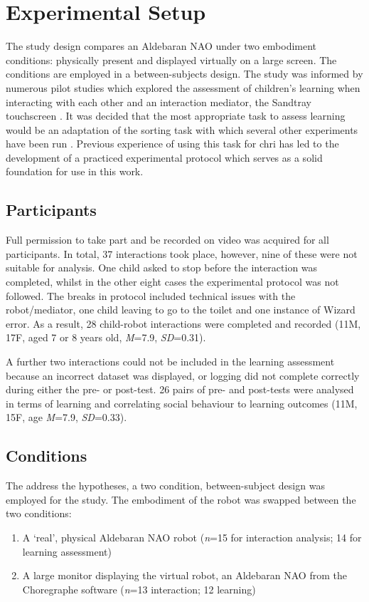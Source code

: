 \section{Experimental Setup}\label{sec:ch6-embodiment-setup}
The study design compares an Aldebaran NAO under two embodiment conditions: physically present and displayed virtually on a large screen. The conditions are employed in a between-subjects design. The study was informed by numerous pilot studies which explored the assessment of children's \gls{learning} when interacting with each other and an interaction mediator, the Sandtray touchscreen \citep{baxter2012touchscreen}. It was decided that the most appropriate task to assess \gls{learning} would be an adaptation of the sorting task with which several other experiments have been run \citep{baxter2013emergence, kennedy2013constraining}. Previous experience of using this task for \acrshort{chri} has led to the development of a practiced experimental protocol which serves as a solid foundation for use in this work.

\subsection{Participants}
Full permission to take part and be recorded on video was acquired for all participants. In total, 37 interactions took place, however, nine of these were not suitable for analysis. One child asked to stop before the interaction was completed, whilst in the other eight cases the experimental protocol was not followed. The breaks in protocol included technical issues with the robot/mediator, one child leaving to go to the toilet and one instance of Wizard error. As a result, 28 child-robot interactions were completed and recorded (11M, 17F, aged 7 or 8 years old, \textit{M}=7.9, \textit{SD}=0.31). 

A further two interactions could not be included in the learning assessment because an incorrect dataset was displayed, or logging did not complete correctly during either the pre- or post-test. 26 pairs of pre- and post-tests were analysed in terms of \gls{learning} and correlating social behaviour to learning outcomes (11M, 15F, age \textit{M}=7.9, \textit{SD}=0.33).

\subsection{Conditions}
The address the hypotheses, a two condition, between-subject design was employed for the study. The embodiment of the robot was swapped between the two conditions:
\begin{enumerate}
	\item A `real', physical Aldebaran NAO robot (\textit{n}=15 for interaction analysis; 14 for \gls{learning} assessment)
	\item A large monitor displaying the virtual robot, an Aldebaran NAO from the Choregraphe software (\textit{n}=13 interaction; 12 learning)
\end{enumerate}

